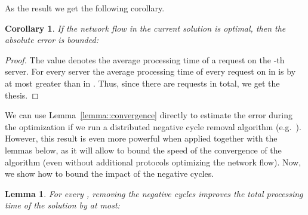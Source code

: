 \documentclass[11pt]{article}
\newtheorem{corollary}[theorem]{Corollary}
\newtheorem{lemma}[theorem]{Lemma}
\begin{document}
As the result we get the following corollary.

\begin{corollary}
If the network flow in the current solution  is optimal, then the absolute error  is bounded:

\end{corollary}
\begin{proof}
The value  denotes the average processing time of a request on the -th server. For every server  the average processing time of every request on  in  is by at most  greater than in . Thus, since there are  requests in total, we get the thesis.
\end{proof}

We can use Lemma~\ref{lemma::convergence} directly to estimate the error during the optimization if we run a distributed negative cycle removal algorithm (e.g.~\cite{minimumCirculation, auctionBasedMinCostFlow}).
However, this result is even more powerful  when applied together with the lemmas below, as it will allow to bound the speed of the convergence of the algorithm (even without additional protocols optimizing the network flow).
Now, we show how to bound the impact of the negative cycles.

\begin{lemma}\label{lemma::negativeCyclesElimination}
For every , removing the negative cycles improves the total processing time  of the solution by at most:

\end{lemma}
\end{document}

